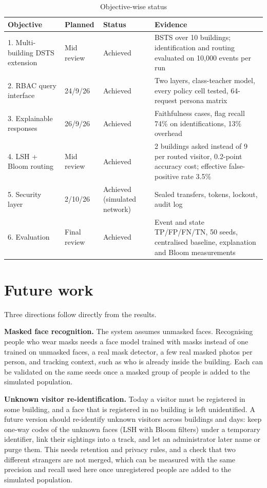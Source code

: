 \documentclass[12pt,a4paper,oneside]{report}
\begin{document}
\begin{table}[htbp]
\centering
\caption{Objective-wise status}\label{tab:status}
{\small\setlength{\tabcolsep}{4pt}\renewcommand{\arraystretch}{1.2}
\begin{tabular}{|p{4.6cm}|p{2.0cm}|p{2.6cm}|p{5.2cm}|}\hline
\textbf{Objective} & \textbf{Planned} & \textbf{Status} & \textbf{Evidence}\\\hline
1. Multi-building DSTS extension & Mid review & Achieved & BSTS over 10 buildings; identification and routing evaluated on 10,000 events per run\\\hline
2. RBAC query interface & 24/9/26 & Achieved & Two layers, class-teacher model, every policy cell tested, 64-request persona matrix\\\hline
3. Explainable responses & 26/9/26 & Achieved & Faithfulness cases, flag recall 74\% on identifications, 13\% overhead\\\hline
4. LSH + Bloom routing & Mid review & Achieved & 2 buildings asked instead of 9 per routed visitor, 0.2-point accuracy cost; effective false-positive rate 3.5\%\\\hline
5. Security layer & 2/10/26 & Achieved (simulated network) & Sealed transfers, tokens, lockout, audit log\\\hline
6. Evaluation & Final review & Achieved & Event and state TP/FP/FN/TN, 50 seeds, centralised baseline, explanation and Bloom measurements\\\hline
\end{tabular}}
\end{table}

\section{Future work}
Three directions follow directly from the results.

\textbf{Masked face recognition.} The system assumes unmasked faces. Recognising people who wear masks needs a face model trained with masks instead of one trained on unmasked faces, a real mask detector, a few real masked photos per person, and tracking context, such as who is already inside the building. Each can be validated on the same seeds once a masked group of people is added to the simulated population.

\textbf{Unknown visitor re-identification.} Today a visitor must be registered in some building, and a face that is registered in no building is left unidentified. A future version should re-identify unknown visitors across buildings and days: keep one-way codes of the unknown faces (LSH with Bloom filters) under a temporary identifier, link their sightings into a track, and let an administrator later name or purge them. This needs retention and privacy rules, and a check that two different strangers are not merged, which can be measured with the same precision and recall used here once unregistered people are added to the simulated population.
\end{document}
